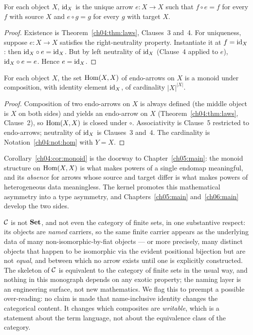 \begin{corollary}
\label{ch04:cor:unique-id}
For each object $X$, $\mathrm{id}_X$ is the unique arrow $e : X \to X$ such that
$f \circ e = f$ for every $f$ with source $X$ and $e \circ g = g$ for every
$g$ with target $X$.
\end{corollary}

\begin{proof}
Existence is Theorem~\ref{ch04:thm:laws}, Clauses~3 and~4. For uniqueness,
suppose $e : X \to X$ satisfies the right-neutrality property. Instantiate
it at $f = \mathrm{id}_X$: then $\mathrm{id}_X \circ e = \mathrm{id}_X$. But by left neutrality of
$\mathrm{id}_X$ (Clause~4 applied to $e$), $\mathrm{id}_X \circ e = e$. Hence
$e = \mathrm{id}_X$.
\end{proof}

\begin{corollary}
\label{ch04:cor:monoid}
For each object $X$, the set $\mathrm{Hom}(X, X)$ of endo-arrows on $X$ is a monoid
under composition, with identity element $\mathrm{id}_X$, of cardinality
$|X|^{|X|}$.
\end{corollary}

\begin{proof}
Composition of two endo-arrows on $X$ is always defined (the middle object
is $X$ on both sides) and yields an endo-arrow on $X$
(Theorem~\ref{ch04:thm:laws}, Clause~2), so $\mathrm{Hom}(X, X)$ is closed under
$\circ$. Associativity is Clause~5 restricted to endo-arrows; neutrality of
$\mathrm{id}_X$ is Clauses~3 and~4. The cardinality is
Notation~\ref{ch04:not:hom} with $Y = X$.
\end{proof}

Corollary~\ref{ch04:cor:monoid} is the doorway to
Chapter~\ref{ch05:main}: the monoid structure on $\mathrm{Hom}(X, X)$ is what makes
powers of a single endomap meaningful, and its \emph{absence} for arrows
whose source and target differ is what makes powers of heterogeneous data
meaningless. The kernel promotes this mathematical asymmetry into a type
asymmetry, and Chapters~\ref{ch05:main} and~\ref{ch06:main} develop the two
sides.

\begin{remark}
\label{ch04:rem:notset}
$\mathcal{C}$ is not $\mathbf{Set}$, and not even the category of finite sets, in one
substantive respect: its objects are \emph{named} carriers, so the same
finite carrier appears as the underlying data of many non-isomorphic-by-fiat
objects --- or more precisely, many distinct objects that happen to be
isomorphic via the evident positional bijection but are not \emph{equal},
and between which no arrow exists until one is explicitly constructed. The
skeleton of $\mathcal{C}$ is equivalent to the category of finite sets in the usual
way, and nothing in this monograph depends on any exotic property; the
naming layer is an engineering surface, not new mathematics. We flag this to
preempt a possible over-reading: no claim is made that name-inclusive
identity changes the categorical content. It changes which composites are
\emph{writable}, which is a statement about the term language, not about the
equivalence class of the category.
\end{remark}

